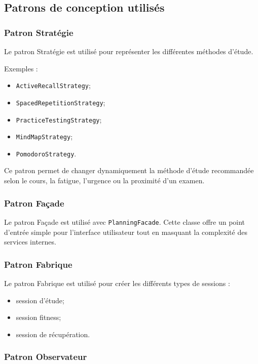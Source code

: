 \documentclass[12pt]{article}
\begin{document}
\subsection{Patrons de conception utilisés}

\subsubsection{Patron Stratégie}

Le patron Stratégie est utilisé pour représenter les différentes méthodes d'étude.

Exemples :
\begin{itemize}
    \item \texttt{ActiveRecallStrategy};
    \item \texttt{SpacedRepetitionStrategy};
    \item \texttt{PracticeTestingStrategy};
    \item \texttt{MindMapStrategy};
    \item \texttt{PomodoroStrategy}.
\end{itemize}

Ce patron permet de changer dynamiquement la méthode d'étude recommandée selon le cours, la fatigue, l'urgence ou la proximité d'un examen.

\subsubsection{Patron Façade}

Le patron Façade est utilisé avec \texttt{PlanningFacade}. Cette classe offre un point d'entrée simple pour l'interface utilisateur tout en masquant la complexité des services internes.

\subsubsection{Patron Fabrique}

Le patron Fabrique est utilisé pour créer les différents types de sessions :

\begin{itemize}
    \item session d'étude;
    \item session fitness;
    \item session de récupération.
\end{itemize}

\subsubsection{Patron Observateur}
\end{document}
